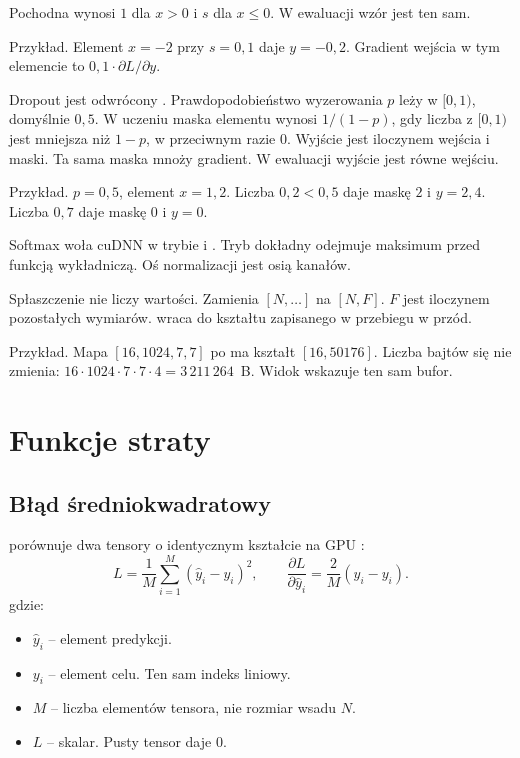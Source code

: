 Pochodna wynosi \(1\) dla \(x > 0\) i \(s\) dla \(x \le 0\). W ewaluacji wzór jest ten sam.

Przykład. Element \(x = -2\) przy \(s = 0{,}1\) daje \(y = -0{,}2\). Gradient wejścia w tym elemencie to \(0{,}1 \cdot \partial L / \partial y\).

Dropout jest odwrócony \cite{srivastava2014dropout}. Prawdopodobieństwo wyzerowania \(p\) leży w \([0, 1)\), domyślnie \(0{,}5\). W uczeniu maska elementu wynosi \(1/(1-p)\), gdy liczba z \([0, 1)\) jest mniejsza niż \(1-p\), w przeciwnym razie \(0\). Wyjście jest iloczynem wejścia i maski. Ta sama maska mnoży gradient. W ewaluacji wyjście jest równe wejściu.

Przykład. \(p = 0{,}5\), element \(x = 1{,}2\). Liczba \(0{,}2 < 0{,}5\) daje maskę \(2\) i \(y = 2{,}4\). Liczba \(0{,}7\) daje maskę \(0\) i \(y = 0\).

Softmax woła cuDNN w trybie  i  \cite{nvidia-cudnn}. Tryb dokładny odejmuje maksimum przed funkcją wykładniczą. Oś normalizacji jest osią kanałów.

Spłaszczenie nie liczy wartości. Zamienia \([N, \ldots]\) na \([N, F]\). \(F\) jest iloczynem pozostałych wymiarów.  wraca do kształtu zapisanego w przebiegu w przód.

Przykład. Mapa \([16, 1024, 7, 7]\) po  ma kształt \([16, 50176]\). Liczba bajtów się nie zmienia: \(16 \cdot 1024 \cdot 7 \cdot 7 \cdot 4 = 3\,211\,264\)~B. Widok wskazuje ten sam bufor.

\section{Funkcje straty}

\subsection{Błąd średniokwadratowy}

 porównuje dwa tensory o identycznym kształcie na GPU \cite{goodfellow2016deep}:
\begin{equation}
\label{eq:mse}
L = \frac{1}{M}\sum_{i=1}^{M}(\hat{y}_i - y_i)^2,
\qquad
\frac{\partial L}{\partial \hat{y}_i} = \frac{2}{M}(\hat{y}_i - y_i).
\end{equation}
gdzie:
\begin{itemize}
\item \(\hat{y}_i\) -- element predykcji.
\item \(y_i\) -- element celu. Ten sam indeks liniowy.
\item \(M\) -- liczba elementów tensora, nie rozmiar wsadu \(N\).
\item \(L\) -- skalar. Pusty tensor daje \(0\).
\end{itemize}

